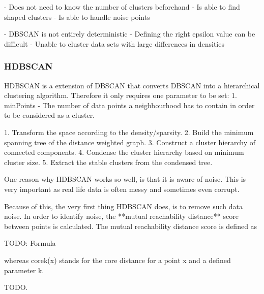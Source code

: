 - Does not need to know the number of clusters beforehand
- Is able to find shaped clusters
- Is able to handle noise points

- DBSCAN is not entirely deterministic
- Defining the right epsilon value can be difficult
- Unable to cluster data sets with large differences in densities

\subsubsection{HDBSCAN}

\iffalse
HDBSCAN is a hierarchical density-based clustering algorithm \cite{McInnes2017}.
It extends the well known [insert citation] DBSCAN algorithm and reduces its sensitivity for clusters of varying densities.
Another important quality of HDBSCAN is, that it does not need to know the number of clusters up front.
\fi

HDBSCAN is a extension of DBSCAN that converts DBSCAN into a hierarchical clustering algorithm.
Therefore it only requires one parameter to be set:
1. minPoints - The number of data points a neighbourhood has to contain in order to be considered as a cluster.

1. Transform the space according to the density/sparsity.
2. Build the minimum spanning tree of the distance weighted graph.
3. Construct a cluster hierarchy of connected components.
4. Condense the cluster hierarchy based on minimum cluster size.
5. Extract the stable clusters from the condensed tree.

One reason why HDBSCAN works so well, is that it is aware of noise.
This is very important as real life data is often messy and sometimes even corrupt.

Because of this, the very first thing HDBSCAN does, is to remove such data noise.
In order to identify noise, the **mutual reachability distance** score between
points is calculated. The mutual reachability distance score is defined as

TODO: Formula

whereas corek(x) stands for the core distance for a point x and a defined parameter k.

TODO.
